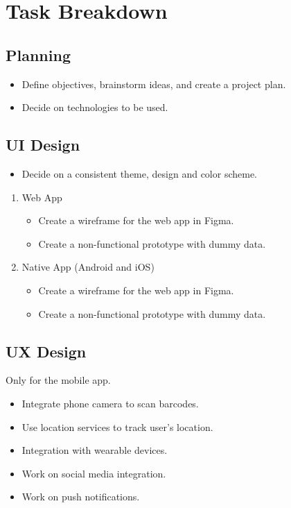 \section{Task Breakdown}

\subsection{Planning}
\begin{itemize}
    \item Define objectives, brainstorm ideas, and create a project plan.
    \item Decide on technologies to be used.
\end{itemize}

\subsection{UI Design}
\begin{itemize}
    \item Decide on a consistent theme, design and color scheme.
\end{itemize}
\begin{enumerate}
    \item Web App
    \begin{itemize}
        \item Create a wireframe for the web app in Figma.
        \item Create a non-functional prototype with dummy data.
    \end{itemize}
    \item Native App (Android and iOS)
    \begin{itemize}
        \item Create a wireframe for the web app in Figma.
        \item Create a non-functional prototype with dummy data.
    \end{itemize}
\end{enumerate}

\subsection{UX Design}
Only for the mobile app.
\begin{itemize}
    \item Integrate phone camera to scan barcodes.
    \item Use location services to track user's location.
    \item Integration with wearable devices.
    \item Work on social media integration.
    \item Work on push notifications.
\end{itemize}


